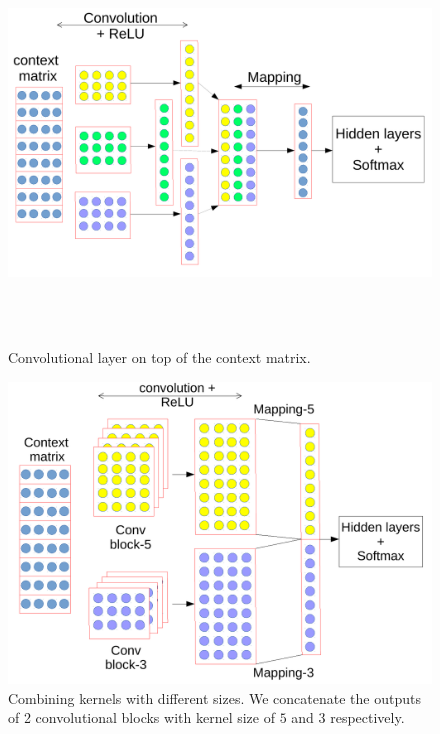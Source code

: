 ~ \begin{figure}[!t]
~ \includegraphics[width=\columnwidth]{figures/convolution.pdf}
~ \caption{Convolutional layer on top of the context matrix.}  
~ \label{fig:simpleconv}
~ \end{figure}
%
\begin{figure}[!t]
\centering
\includegraphics[width=\columnwidth]{figures/combine.pdf}
\caption{Combining kernels with different sizes. We concatenate the outputs of 2 convolutional blocks with kernel size of $5$ and $3$ respectively.}  
\label{fig:combine}
\end{figure}